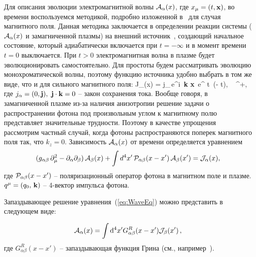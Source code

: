 Для описания эволюции электромагнитной волны ${\cal A}_{\alpha}(x)$, где $x_\mu = (t, {\bf x})$, 
во времени воспользуемся методикой, подробно изложенной в~\cite{MikhChist:2001} для случая магнитного поля. Данная методика заключается в определении реакции системы 
(${\cal A}_{\alpha}(x)$ и замагниченной плазмы) на внешний источник~\cite{Kirzhnits:1987}, создающий начальное состояние, который адиабатически включается 
при $t = - \infty$ и в момент времени $t = 0$ выключается. При $t > 0$
электромагнитная волна в плазме будет эволюционировать самостоятельно. Для простоты будем рассматривать эволюцию монохроматической волны, поэтому 
функцию источника удобно выбрать в том же виде, что и для сильного магнитного поля:
%
\beq
{\cal J}_{\alpha}(x) = j_{\alpha}\,e^{i \,{\bf k} {\bf x}}\,
e^{ \varepsilon t}\, \theta(- t), \,\,\, \varepsilon {}^+,
\label{eq:1}
\eeq
где $j_{\alpha} = (0, {\bf j}),\,\,{\bf j} \cdot {\bf k} = 0$ – закон сохранения тока. Вообще говоря, в замагниченной плазме из-за наличия анизотропии решение задачи о распространении фотона под произвольным углом к магнитному полю представляет значительные трудности. Поэтому в качестве упрощения рассмотрим частный случай, когда фотоны распространяются поперек магнитного поля так, что $k_z=0$. Зависимость ${\cal A}_{\alpha}(x)$ от времени  определяется уравнением
%
\begin{eqnarray}\label{eq:WaveEq}
(g_{\alpha \beta} \, \partial_{\mu}^2  -
\partial_{\alpha}\partial_{\beta}) \, {\cal A}_{\beta}(x) + 
\int d^4 x'\, {\cal P}_{\alpha \beta} (x - x') \, {\cal A}_{\beta}(x')
= {\cal J}_{\alpha}(x),
\label{eq:2}
\end{eqnarray}
где ${\cal P}_{\alpha \beta} (x - x')$ -- поляризационный оператор фотона в магнитном поле и плазме. $q^{\mu} = (q_0,\, {\bf k})$ -- 4-вектор импульса фотона.


Запаздывающее решение уравнения~(\ref{eq:WaveEq}) можно представить в следующем виде:

\begin{equation}\label{eq:RetSol}
	{\cal A}_\alpha(x)=\int \mathrm{d}^4 x' G^R_{\alpha \beta}(x-x'){\cal J}_\beta(x')\, ,
\end{equation}
где $G^R_{\alpha \beta}(x-x')$ -- запаздывающая функция Грина (см., например~\cite{Landau:2001}).

